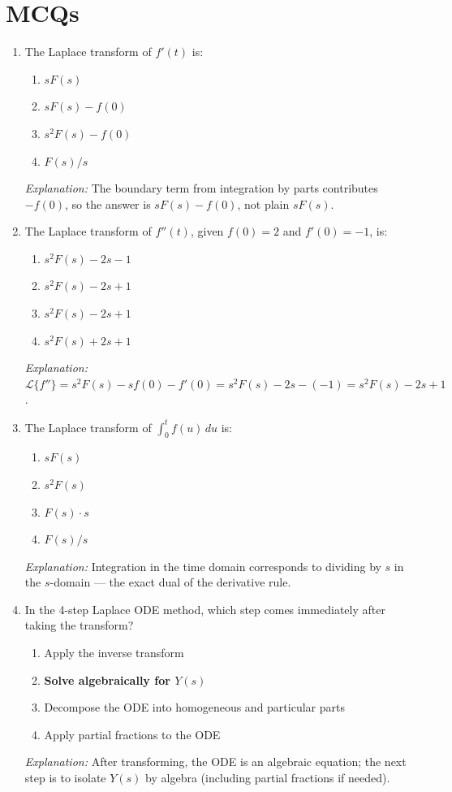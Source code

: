 \documentclass[12pt,a4paper]{article}
\begin{document}
\section{MCQs}

\begin{enumerate}[label=\textbf{MCQ \arabic*.}]

\item The Laplace transform of \(f'(t)\) is:
\begin{enumerate}[label=(\alph*)]
  \item \(sF(s)\)
  \item \textbf{\(sF(s) - f(0)\)}
  \item \(s^2F(s) - f(0)\)
  \item \(F(s)/s\)
\end{enumerate}
\textit{Explanation:} The boundary term from integration by parts contributes \(-f(0)\),
so the answer is \(sF(s)-f(0)\), not plain \(sF(s)\).

\item The Laplace transform of \(f''(t)\), given \(f(0)=2\) and \(f'(0)=-1\), is:
\begin{enumerate}[label=(\alph*)]
  \item \(s^2F(s) - 2s - 1\)
  \item \(s^2F(s) - 2s + 1\)
  \item \textbf{\(s^2F(s) - 2s + 1\)}
  \item \(s^2F(s) + 2s + 1\)
\end{enumerate}
\textit{Explanation:} \(\mathcal{L}\{f''\}=s^2F(s)-sf(0)-f'(0)=s^2F(s)-2s-(-1)=s^2F(s)-2s+1\).

\item The Laplace transform of \(\int_0^t f(u)\,du\) is:
\begin{enumerate}[label=(\alph*)]
  \item \(sF(s)\)
  \item \(s^2F(s)\)
  \item \(F(s)\cdot s\)
  \item \textbf{\(F(s)/s\)}
\end{enumerate}
\textit{Explanation:} Integration in the time domain corresponds to dividing by \(s\)
in the \(s\)-domain --- the exact dual of the derivative rule.

\item In the 4-step Laplace ODE method, which step comes immediately after taking the transform?
\begin{enumerate}[label=(\alph*)]
  \item Apply the inverse transform
  \item \textbf{Solve algebraically for \(Y(s)\)}
  \item Decompose the ODE into homogeneous and particular parts
  \item Apply partial fractions to the ODE
\end{enumerate}
\textit{Explanation:} After transforming, the ODE is an algebraic equation;
the next step is to isolate \(Y(s)\) by algebra (including partial fractions if needed).


\end{enumerate}
\end{document}
